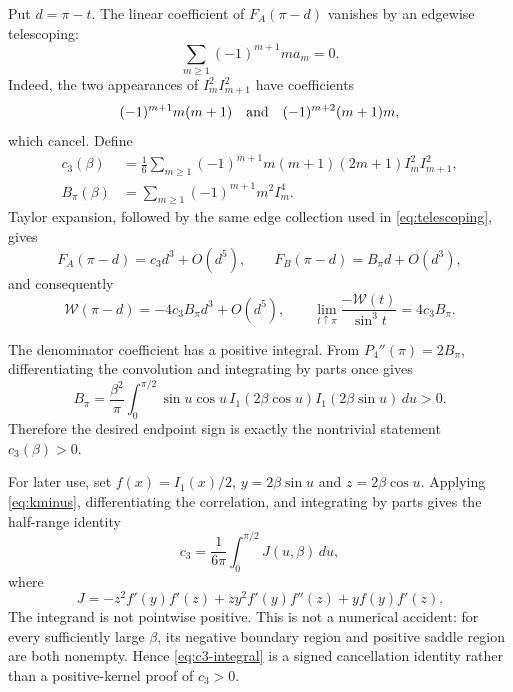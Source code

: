\documentclass[11pt]{article}
\theoremstyle{definition}
\theoremstyle{remark}
\newcommand{\FA}{F_{\!A}}
\newcommand{\FB}{F_{\!B}}
\newcommand{\W}{\mathcal W}
\begin{document}
Put $d=\pi-t$.  The linear coefficient of $\FA(\pi-d)$ vanishes by an
edgewise telescoping:
\begin{equation}\label{eq:telescoping}
 \sum_{m\ge1}(-1)^{m+1}ma_m=0.
\end{equation}
Indeed, the two appearances of $I_m^2I_{m+1}^2$ have coefficients
\[
 (-1)^{m+1}m(m+1)
 \quad\hbox{and}\quad
 (-1)^{m+2}(m+1)m,
\]
which cancel.  Define
\begin{align}
 c_3(\beta)&=\frac{1}{6}\sum_{m\ge1}(-1)^{m+1}
 m(m+1)(2m+1)I_m^2I_{m+1}^2,\label{eq:c3}\\
 B_\pi(\beta)&=\sum_{m\ge1}(-1)^{m+1}m^2I_m^4.\label{eq:bpi}
\end{align}
Taylor expansion, followed by the same edge collection used in
\eqref{eq:telescoping}, gives
\begin{equation}\label{eq:endexp}
 \FA(\pi-d)=c_3d^3+O(d^5),\qquad
 \FB(\pi-d)=B_\pi d+O(d^3),
\end{equation}
and consequently
\begin{equation}\label{eq:wend}
 \W(\pi-d)=-4c_3B_\pi d^3+O(d^5),
 \qquad
 \lim_{t\uparrow\pi}\frac{-\W(t)}{\sin^3t}=4c_3B_\pi.
\end{equation}

The denominator coefficient has a positive integral.  From
$P_4''(\pi)=2B_\pi$, differentiating the convolution and integrating by
parts once gives
\begin{equation}\label{eq:bpi-integral}
 B_\pi=\frac{\beta^2}{\pi}\int_0^{\pi/2}
 \sin u\cos u\,I_1(2\beta\cos u)I_1(2\beta\sin u)\,du>0.
\end{equation}
Therefore the desired endpoint sign is exactly the nontrivial statement
$c_3(\beta)>0$.

For later use, set $f(x)=I_1(x)/2$, $y=2\beta\sin u$ and
$z=2\beta\cos u$.  Applying \eqref{eq:kminus}, differentiating the
correlation, and integrating by parts gives the half-range identity
\begin{equation}\label{eq:c3-integral}
 c_3=\frac{1}{6\pi}\int_0^{\pi/2}J(u,\beta)\,du,
\end{equation}
where
\begin{equation}\label{eq:J}
 J=-z^2f'(y)f'(z)+zy^2f'(y)f''(z)+yf(y)f'(z).
\end{equation}
The integrand is not pointwise positive.  This is not a numerical
accident: for every sufficiently large $\beta$, its negative boundary
region and positive saddle region are both nonempty.  Hence
\eqref{eq:c3-integral} is a signed cancellation identity rather than a
positive-kernel proof of $c_3>0$.
\end{document}
